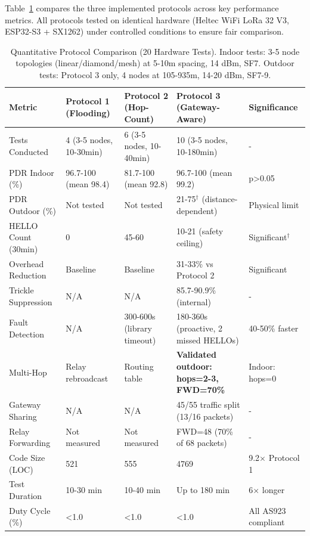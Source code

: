 Table~\ref{tab:protocol-comparison} compares the three implemented protocols across key performance metrics. All protocols tested on identical hardware (Heltec WiFi LoRa 32 V3, ESP32-S3 + SX1262) under controlled conditions to ensure fair comparison.

\begin{table}[h]
\centering
\caption{Quantitative Protocol Comparison (20 Hardware Tests). Indoor tests: 3-5 node topologies (linear/diamond/mesh) at 5-10m spacing, 14 dBm, SF7. Outdoor tests: Protocol 3 only, 4 nodes at 105-935m, 14-20 dBm, SF7-9.}
\label{tab:protocol-comparison}
\small
\begin{tabular}{p{3.5cm}p{2.5cm}p{2.5cm}p{3cm}p{2.5cm}}
\hline
\textbf{Metric} & \textbf{Protocol 1 (Flooding)} & \textbf{Protocol 2 (Hop-Count)} & \textbf{Protocol 3 (Gateway-Aware)} & \textbf{Significance} \\
\hline
Tests Conducted & 4 (3-5 nodes, 10-30min) & 6 (3-5 nodes, 10-40min) & 10 (3-5 nodes, 10-180min) & - \\
\hline
PDR Indoor (\%) & 96.7-100 (mean 98.4) & 81.7-100 (mean 92.8) & 96.7-100 (mean 99.2) & p>0.05 \\
\hline
PDR Outdoor (\%) & Not tested & Not tested & 21-75$^\dagger$ (distance-dependent) & Physical limit \\
\hline
HELLO Count (30min) & 0 & 45-60 & 10-21 (safety ceiling) & Significant$^\dagger$ \\
\hline
Overhead Reduction & Baseline & Baseline & 31-33\% vs Protocol 2 & Significant \\
\hline
Trickle Suppression & N/A & N/A & 85.7-90.9\% (internal) & - \\
\hline
Fault Detection & N/A & 300-600s (library timeout) & 180-360s (proactive, 2 missed HELLOs) & 40-50\% faster \\
\hline
Multi-Hop & Relay rebroadcast & Routing table & \textbf{Validated outdoor: hops=2-3, FWD=70\%} & Indoor: hops=0 \\
\hline
Gateway Sharing & N/A & N/A & 45/55 traffic split (13/16 packets) & - \\
\hline
Relay Forwarding & Not measured & Not measured & FWD=48 (70\% of 68 packets) & - \\
\hline
Code Size (LOC) & 521 & 555 & 4769 & 9.2$\times$ Protocol 1 \\
\hline
Test Duration & 10-30 min & 10-40 min & Up to 180 min & 6$\times$ longer \\
\hline
Duty Cycle (\%) & <1.0 & <1.0 & <1.0 & All AS923 compliant \\
\hline
\end{tabular}
\end{table}

